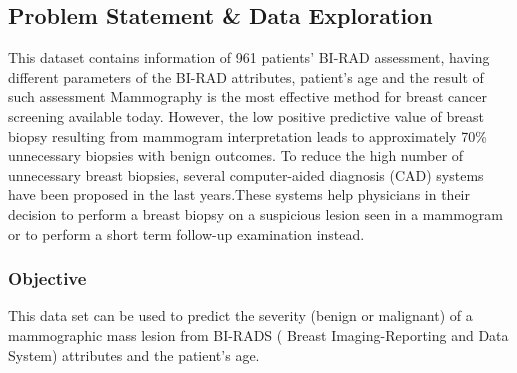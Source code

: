 \documentclass[a4paper,12pt]{article}\usepackage[]{graphicx}\usepackage[]{color}
\begin{document}
\clearpage

\subsection{Problem Statement \& Data Exploration}\label{dataexp}
This dataset contains information of 961 patients' BI-RAD assessment, having different parameters of the BI-RAD attributes, patient's age and the result of such assessment
Mammography is the most effective method for breast cancer screening available today. However, the low positive predictive value of breast biopsy resulting from mammogram interpretation leads to approximately 70\% unnecessary biopsies with benign outcomes. To reduce the high number of unnecessary breast biopsies, several computer-aided diagnosis (CAD) systems have been proposed in the last years.These systems help physicians in their decision to perform a breast biopsy on a suspicious lesion seen in a mammogram or to perform a short term follow-up examination instead.

\subsubsection{Objective}\label{objective}
This data set can be used to predict the severity (benign or malignant) of a mammographic mass lesion from BI-RADS ( Breast Imaging-Reporting and Data System) attributes and the patient's age.
\end{document}
